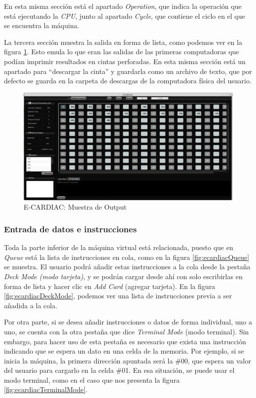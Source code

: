 \documentclass[letterpaper,12pt,oneside]{book}
\begin{document}
	En esta misma sección está el apartado \textit{Operation}, que indica la operación que está ejecutando la \textit{CPU}, junto
	al apartado \textit{Cycle}, que contiene el ciclo en el que se encuentra la máquina.

  
 
	La tercera sección muestra la salida en forma de lista, como podemos ver en la figura \ref{fig:ecardiacOutput}. Esto emula lo que eran las salidas 
	de las primeras 
	computadoras que podían imprimir resultados
	en cintas perforadas. En esta misma sección está un apartado para ``descargar la cinta'' y guardarla
	como un archivo de texto, que por defecto se guarda en la carpeta de descargas de la computadora física del usuario.

	\begin{figure}[h]
 			\centering
			\includegraphics[scale=0.33]{media/ECARDIAC/OutputFullfilled.png}
			\caption{E-CARDIAC: Muestra de Output}
			\label{fig:ecardiacOutput}
	\end{figure}

    \subsubsection{Entrada de datos e instrucciones}
 
	Toda la parte inferior de la máquina virtual está relacionada, puesto que en \textit{Queue} está la lista de instrucciones en cola, como en la figura \ref{fig:ecardiacQueue} se muestra. El usuario podrá añadir 
	estas instrucciones a la cola desde la pestaña \textit{Deck Mode (modo tarjeta)}, y se podrán cargar desde ahí con solo escribirlas
	en forma de lista y hacer clic en \textit{Add Card} (agregar tarjeta). En la figura \ref{fig:ecardiacDeckMode}, podemos ver una
	lista de instrucciones previa a ser añadida a la cola.
 
    Por otra parte, si se desea añadir instrucciones o datos de forma individual, uno a uno, se cuenta
	con la otra pestaña que dice \textit{Terminal Mode} (modo terminal). Sin embargo, para hacer uso
	de esta pestaña es necesario que exista una instrucción indicando que se espera un dato en una celda de la memoria. Por ejemplo, si se inicia la 
	máquina,
	la primera dirección apuntada será la \#00, que espera un valor del usuario para cargarlo
	en la celda \#01. En esa situación, se puede usar el modo terminal, como en el caso que nos presenta la figura \ref{fig:ecardiacTerminalMode}.
	
\end{document}

